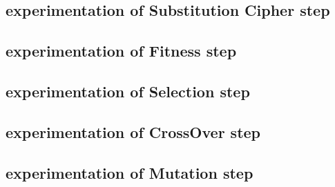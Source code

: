 \subsection{experimentation of Substitution Cipher step}
\subsection{experimentation of Fitness step}
\subsection{experimentation of Selection step}
\subsection{experimentation of CrossOver step}
\subsection{experimentation of Mutation step}